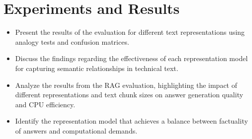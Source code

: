 
\chapter{Experiments and Results\label{chap:experiments_and_results}}

\begin{itemize}
    \item Present the results of the evaluation for different text representations using analogy tests and confusion matrices.
    \item Discuss the findings regarding the effectiveness of each representation model for capturing semantic relationships in technical text.
    \item Analyze the results from the RAG evaluation, highlighting the impact of different representations and text chunk sizes on answer generation quality and CPU efficiency.
    \item Identify the representation model that achieves a balance between factuality of answers and computational demands.
\end{itemize}
